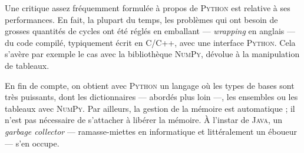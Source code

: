 %
Une critique assez fréquemment formulée à propos de \textsc{Python} est relative à ses performances. En fait, la plupart du temps, les problèmes qui ont besoin de grosses quantités de cycles ont été réglés en emballant --- \textit{wrapping} en anglais --- du code compilé, typiquement écrit en \textsc{C/C++}, avec une interface \textsc{Python}. Cela s'avère par exemple le cas avec la bibliothèque \textsc{NumPy}, dévolue à la manipulation de tableaux.

%
En fin de compte, on obtient avec \textsc{Python} un langage où les types de bases sont très puissants, dont les dictionnaires --- abordés plus loin ---, les ensembles ou les tableaux avec \textsc{NumPy}. 
Par ailleurs, la gestion de la mémoire est automatique ; il n'est pas nécessaire de s'attacher à libérer la mémoire. À l'instar de \textsc{Java}, un \textit{garbage collector} --- ramasse-miettes en informatique et littéralement un éboueur --- s'en occupe. 

